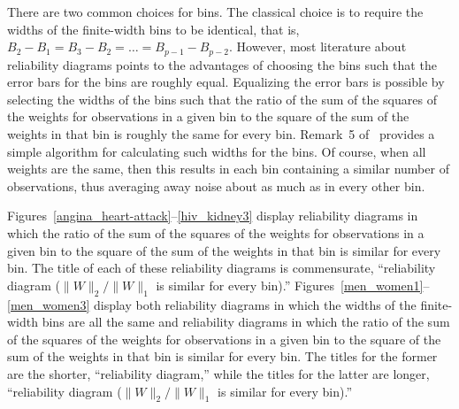 \documentclass[]{fairmeta}
\begin{document}
There are two common choices for bins. The classical choice is to require
the widths of the finite-width bins to be identical, that is,
$B_2 - B_1 = B_3 - B_2 = \dots = B_{p-1} - B_{p-2}$.
However, most literature about reliability diagrams points to the advantages
of choosing the bins such that the error bars for the bins are roughly equal.
Equalizing the error bars is possible by selecting the widths of the bins
such that the ratio of the sum of the squares of the weights for observations
in a given bin to the square of the sum of the weights in that bin is roughly
the same for every bin. Remark~5 of~\cite{tygert_full} provides
a simple algorithm for calculating such widths for the bins.
Of course, when all weights are the same, then this results in each bin
containing a similar number of observations,
thus averaging away noise about as much as in every other bin.

Figures~\ref{angina_heart-attack}--\ref{hiv_kidney3}
display reliability diagrams in which the ratio of the sum of the squares
of the weights for observations in a given bin to the square of the sum
of the weights in that bin is similar for every bin.
The title of each of these reliability diagrams is commensurate,
``reliability diagram ($\|W\|_2 / \|W\|_1$ is similar for every bin).''
Figures~\ref{men_women1}--\ref{men_women3}
display both reliability diagrams in which the widths of the finite-width bins
are all the same and reliability diagrams in which the ratio of the sum
of the squares of the weights for observations in a given bin to the square
of the sum of the weights in that bin is similar for every bin.
The titles for the former are the shorter, ``reliability diagram,''
while the titles for the latter are longer,
``reliability diagram ($\|W\|_2 / \|W\|_1$ is similar for every bin).''





\end{document}
